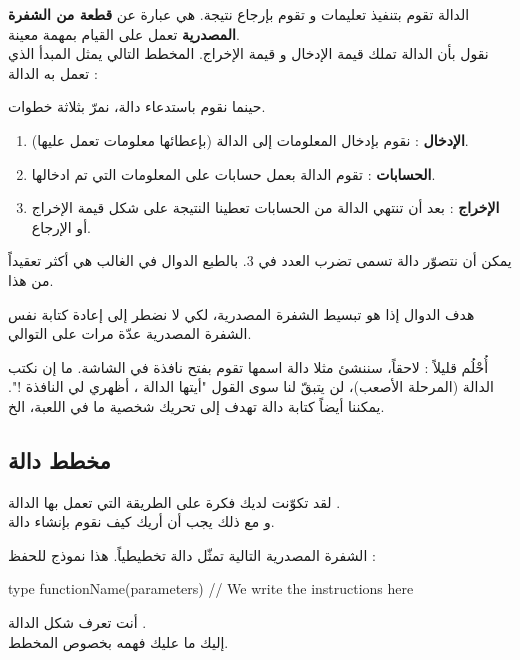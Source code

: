 الدالة تقوم بتنفيذ تعليمات و تقوم بإرجاع نتيجة. هي عبارة عن 
\textbf{قطعة من الشفرة المصدرية} 
تعمل على القيام بمهمة معينة.\\
نقول بأن الدالة تملك قيمة الإدخال و قيمة الإخراج. المخطط التالي يمثل المبدأ الذي تعمل به الدالة :


حينما نقوم باستدعاء دالة، نمرّ بثلاثة خطوات.

\begin{enumerate}
	\item \textbf{الإدخال}
	: نقوم بإدخال المعلومات إلى الدالة (بإعطائها معلومات تعمل عليها).
	\item \textbf{الحسابات}
	: تقوم الدالة بعمل حسابات على المعلومات التي تم ادخالها.
	\item \textbf{الإخراج}
	: بعد أن تنتهي الدالة من الحسابات تعطينا النتيجة على شكل قيمة الإخراج أو الإرجاع.
\end{enumerate}

يمكن أن نتصوّر دالة تسمى
تضرب العدد في 3. بالطبع الدوال في الغالب هي أكثر تعقيداً من هذا.


هدف الدوال إذا هو تبسيط الشفرة المصدرية، لكي لا نضطر إلى إعادة كتابة نفس الشفرة المصدرية عدّة مرات على التوالي.

أُحْلُم قليلاً : لاحقاً، سننشئ مثلا دالة اسمها
تقوم بفتح نافذة في الشاشة. ما إن نكتب الدالة (المرحلة الأصعب)، لن يتبقّ لنا سوى القول "أيتها الدالة
،
أظهري لي النافذة !". يمكننا أيضاً كتابة دالة
تهدف إلى تحريك شخصية ما في اللعبة، الخ.

\subsection{مخطط دالة}

لقد تكوّنت لديك فكرة على الطريقة التي تعمل بها الدالة 
.\\
و مع ذلك يجب أن أريك كيف نقوم بإنشاء دالة. 

الشفرة المصدرية التالية تمثّل دالة تخطيطياً. هذا نموذج للحفظ :

\begin{Csource}
type functionName(parameters)
{
	// We write the instructions here
}
\end{Csource}

أنت تعرف شكل الدالة
.\\
إليك ما عليك فهمه بخصوص المخطط.

